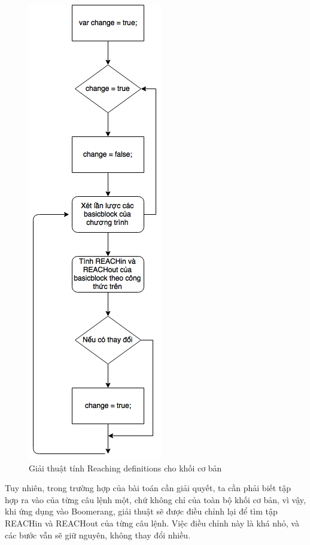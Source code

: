 \begin{figure}
	\centering
	\includegraphics[scale=0.75]{image/reachingDefAlgo}
	\caption{Giải thuật tính Reaching definitions cho khối cơ bản}
	\label{fig:reachingdefalgo}
\end{figure}

Tuy nhiên, trong trường hợp của bài toán cần giải quyết, ta cần phải biết tập hợp ra vào của từng câu lệnh một, chứ không chỉ của toàn bộ khối cơ bản, vì vậy, khi ứng dụng vào Boomerang, giải thuật sẽ được điều chỉnh lại để tìm tập REACHin và REACHout của từng câu lệnh. Việc điều chỉnh này là khá nhỏ, và các bước vẫn sẽ giữ nguyên, không thay đổi nhiều.\\

